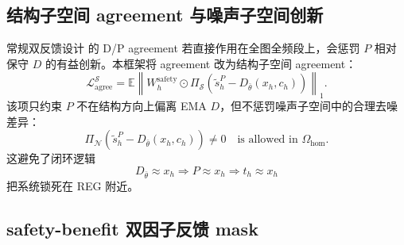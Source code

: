 \documentclass[11pt,a4paper,UTF8,fontset=fandol]{ctexart}
\theoremstyle{definition}
\newcommand{\norm}[1]{\left\lVert#1\right\rVert}
\newcommand{\E}{\mathbb{E}}
\begin{document}
\subsection{结构子空间 agreement 与噪声子空间创新}
\label{subsec:coreC-structural-agreement}

常规双反馈设计 的 D/P agreement 若直接作用在全图全频段上，会惩罚 $P$ 相对保守 $D$ 的有益创新。本框架将 agreement 改为结构子空间 agreement：
\begin{equation}
\label{eq:struct-agree-coreC}
    \mathcal L_{\mathrm{agree}}^{\mathcal S}
    =\E\norm{W_h^{\mathrm{safety}}\odot
    \Pi_{\mathcal S}\left(\tilde s_h^P-D_{\bar\theta}(x_h,c_h)\right)}_1.
\end{equation}
该项只约束 $P$ 不在结构方向上偏离 EMA $D$，但不惩罚噪声子空间中的合理去噪差异：
\begin{equation}
\label{eq:noise-innovation-allowed-coreC}
    \Pi_{\mathcal N}\left(\tilde s_h^P-D_{\bar\theta}(x_h,c_h)\right)
    \neq 0
    \quad\text{is allowed in }\Omega_{\mathrm{hom}}.
\end{equation}
这避免了闭环逻辑
\begin{equation}
    D_{\bar\theta}\approx x_h\Rightarrow P\approx x_h\Rightarrow t_h\approx x_h
\end{equation}
把系统锁死在 REG 附近。

\subsection{safety-benefit 双因子反馈 mask}
\label{subsec:coreC-safety-benefit-mask}
\end{document}
